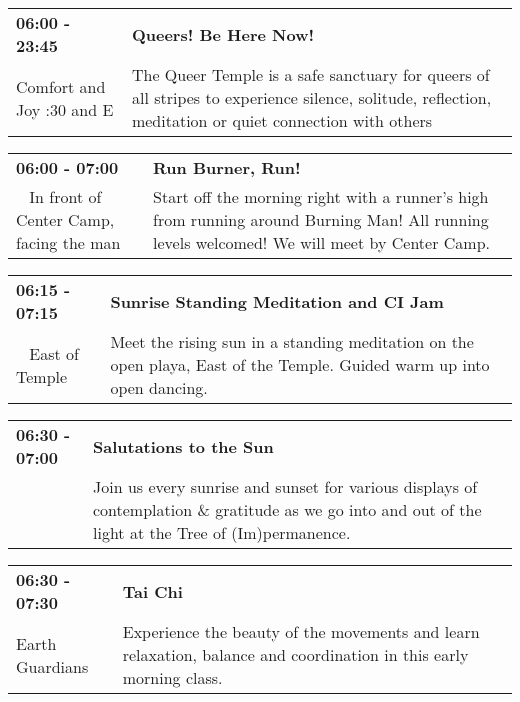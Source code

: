 \begin{tabular}{ p{1in} p{2.2in} }
    \textbf{06:00 - 23:45} & \textbf{Queers! Be Here Now!} \\
    Comfort and Joy \newline 7:30 and E & The Queer Temple is a safe sanctuary for queers of all stripes to experience silence, solitude, reflection, meditation or quiet connection with others \\
    \hline 
\end{tabular}
    
\begin{tabular}{ p{1in} p{2.2in} }
    \textbf{06:00 - 07:00} & \textbf{Run Burner, Run!} \\
    ~ \newline In front of Center Camp, facing the man & Start off the morning right with a runner's high from running around Burning Man! All running levels welcomed! We will meet by Center Camp. \\
    \hline 
\end{tabular}
    
\begin{tabular}{ p{1in} p{2.2in} }
    \textbf{06:15 - 07:15} & \textbf{Sunrise Standing Meditation and CI Jam} \\
    ~ \newline East of Temple & Meet the rising sun in a standing meditation on the open playa, East of the Temple. Guided warm up into open dancing. \\
    \hline 
\end{tabular}
    
\begin{tabular}{ p{1in} p{2.2in} }
    \textbf{06:30 - 07:00} & \textbf{Salutations to the Sun} \\
    ~ \newline  & Join us every sunrise and sunset for various displays of contemplation \& gratitude as we go into and out of the light at the Tree of (Im)permanence. \\
    \hline 
\end{tabular}
    
\begin{tabular}{ p{1in} p{2.2in} }
    \textbf{06:30 - 07:30} & \textbf{Tai Chi } \\
    Earth Guardians \newline  & Experience the beauty of the movements and learn relaxation, balance and coordination in this early morning class. \\
    \hline 
\end{tabular}
    
